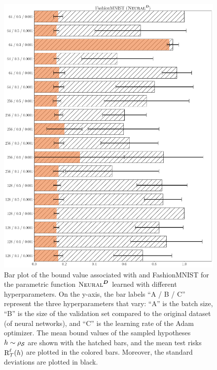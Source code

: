 \documentclass[twoside]{article}
\theoremstyle{plain}
\begin{document}
\begin{figure}
\includegraphics[width=0.9\linewidth]{figures/fig_7_dist_fashion.pdf}
\caption{
Bar plot of the bound value associated with  and FashionMNIST for the parametric function $\text{\sc Neural}^{\boldsymbol{D}}$ learned with different hyperparameters.
On the y-axis, the bar labels ``A / B / C'' represent the three hyperparameters that vary: ``A'' is the batch size, ``B'' is the size of the validation set compared to the original dataset (of neural networks), and ``C'' is the learning rate of the Adam optimizer.
The mean bound values of the sampled hypotheses $h\sim\rho_{\mathcal{S}}$ are shown with the hatched bars, and the mean test risks $\text{R}^{\ell}_{\mathcal{T}}(h)$ are plotted in the colored bars.
Moreover, the standard deviations are plotted in black.
}
\label{fig:dist-neural-fashion}
\end{figure}
\end{document}
